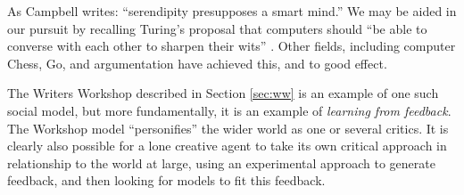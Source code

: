 As Campbell \citeyear{campbell} writes: ``serendipity
presupposes a smart mind.''  We may be aided in our pursuit by
recalling Turing's proposal that computers should ``be able to
converse with each other to sharpen their wits''
\cite{turing-intelligent}.  Other fields, including computer Chess,
Go, and argumentation have achieved this, and to good effect.

The Writers Workshop described in Section \ref{sec:ww} is an example
of one such social model, but more fundamentally, it is an example of
\emph{learning from feedback}.  The Workshop model ``personifies'' the
wider world as one or several critics.  It is clearly also possible
for a lone creative agent to take its own critical approach in relationship
to the world at large, using an experimental approach to generate
feedback, and then looking for models to fit this feedback.


